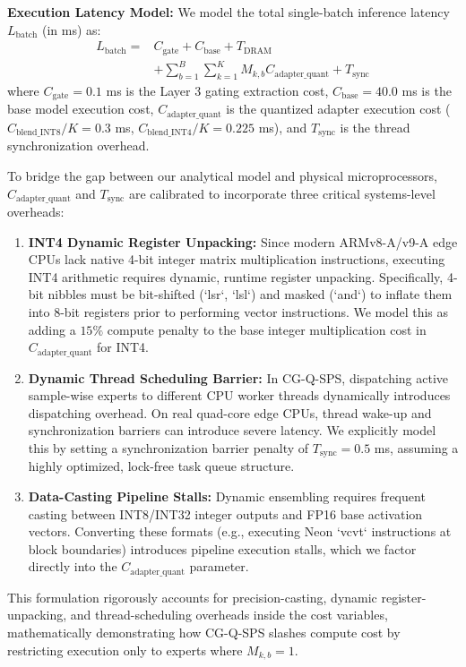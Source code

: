 \textbf{Execution Latency Model:} We model the total single-batch inference latency $L_{\text{batch}}$ (in ms) as:
\begin{equation}
  \begin{split}
    L_{\text{batch}} = & C_{\text{gate}} + C_{\text{base}} + T_{\text{DRAM}} \\
    & + \sum_{b=1}^B \sum_{k=1}^K M_{k, b} C_{\text{adapter\_quant}} + T_{\text{sync}}
  \end{split}
\end{equation}
where $C_{\text{gate}} = 0.1$ ms is the Layer 3 gating extraction cost, $C_{\text{base}} = 40.0$ ms is the base model execution cost, $C_{\text{adapter\_quant}}$ is the quantized adapter execution cost ($C_{\text{blend\_INT8}} / K = 0.3$ ms, $C_{\text{blend\_INT4}} / K = 0.225$ ms), and $T_{\text{sync}}$ is the thread synchronization overhead.

To bridge the gap between our analytical model and physical microprocessors, $C_{\text{adapter\_quant}}$ and $T_{\text{sync}}$ are calibrated to incorporate three critical systems-level overheads:
\begin{enumerate}
  \item \textbf{INT4 Dynamic Register Unpacking:} Since modern ARMv8-A/v9-A edge CPUs lack native 4-bit integer matrix multiplication instructions, executing INT4 arithmetic requires dynamic, runtime register unpacking. Specifically, 4-bit nibbles must be bit-shifted (`lsr`, `lsl`) and masked (`and`) to inflate them into 8-bit registers prior to performing vector instructions. We model this as adding a $15\%$ compute penalty to the base integer multiplication cost in $C_{\text{adapter\_quant}}$ for INT4.
  \item \textbf{Dynamic Thread Scheduling Barrier:} In CG-Q-SPS, dispatching active sample-wise experts to different CPU worker threads dynamically introduces dispatching overhead. On real quad-core edge CPUs, thread wake-up and synchronization barriers can introduce severe latency. We explicitly model this by setting a synchronization barrier penalty of $T_{\text{sync}} = 0.5$ ms, assuming a highly optimized, lock-free task queue structure.
  \item \textbf{Data-Casting Pipeline Stalls:} Dynamic ensembling requires frequent casting between INT8/INT32 integer outputs and FP16 base activation vectors. Converting these formats (e.g., executing Neon `vcvt` instructions at block boundaries) introduces pipeline execution stalls, which we factor directly into the $C_{\text{adapter\_quant}}$ parameter.
\end{enumerate}
This formulation rigorously accounts for precision-casting, dynamic register-unpacking, and thread-scheduling overheads inside the cost variables, mathematically demonstrating how CG-Q-SPS slashes compute cost by restricting execution only to experts where $M_{k, b} = 1$.

